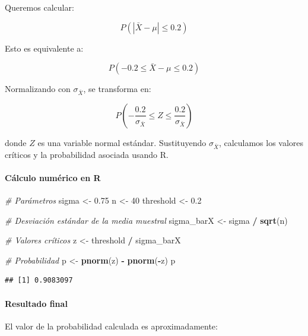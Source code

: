 \documentclass[
]{article}
\newenvironment{Shaded}{\begin{snugshade}}{\end{snugshade}}
\newcommand{\CommentTok}[1]{\textcolor[rgb]{0.56,0.35,0.01}{\textit{#1}}}
\newcommand{\DecValTok}[1]{\textcolor[rgb]{0.00,0.00,0.81}{#1}}
\newcommand{\FloatTok}[1]{\textcolor[rgb]{0.00,0.00,0.81}{#1}}
\newcommand{\FunctionTok}[1]{\textcolor[rgb]{0.13,0.29,0.53}{\textbf{#1}}}
\newcommand{\NormalTok}[1]{#1}
\newcommand{\OtherTok}[1]{\textcolor[rgb]{0.56,0.35,0.01}{#1}}
\newcommand{\SpecialCharTok}[1]{\textcolor[rgb]{0.81,0.36,0.00}{\textbf{#1}}}
\begin{document}
Queremos calcular:

\[
P(|\bar{X} - \mu| \leq 0.2)
\]

Esto es equivalente a:

\[
P\left(-0.2 \leq \bar{X} - \mu \leq 0.2\right)
\]

Normalizando con \(\sigma_{\bar{X}}\), se transforma en:

\[
P\left(-\frac{0.2}{\sigma_{\bar{X}}} \leq Z \leq \frac{0.2}{\sigma_{\bar{X}}}\right)
\]

donde \(Z\) es una variable normal estándar. Sustituyendo \(\sigma_{\bar{X}}\), calculamos los valores críticos y la probabilidad asociada usando R.

\paragraph{Cálculo numérico en R}\label{cuxe1lculo-numuxe9rico-en-r}

\begin{Shaded}
\begin{Highlighting}[]
\CommentTok{\# Parámetros}
\NormalTok{sigma }\OtherTok{\textless{}{-}} \FloatTok{0.75}
\NormalTok{n }\OtherTok{\textless{}{-}} \DecValTok{40}
\NormalTok{threshold }\OtherTok{\textless{}{-}} \FloatTok{0.2}

\CommentTok{\# Desviación estándar de la media muestral}
\NormalTok{sigma\_barX }\OtherTok{\textless{}{-}}\NormalTok{ sigma }\SpecialCharTok{/} \FunctionTok{sqrt}\NormalTok{(n)}

\CommentTok{\# Valores críticos}
\NormalTok{z }\OtherTok{\textless{}{-}}\NormalTok{ threshold }\SpecialCharTok{/}\NormalTok{ sigma\_barX}

\CommentTok{\# Probabilidad}
\NormalTok{p }\OtherTok{\textless{}{-}} \FunctionTok{pnorm}\NormalTok{(z) }\SpecialCharTok{{-}} \FunctionTok{pnorm}\NormalTok{(}\SpecialCharTok{{-}}\NormalTok{z)}
\NormalTok{p}
\end{Highlighting}
\end{Shaded}

\begin{verbatim}
## [1] 0.9083097
\end{verbatim}

\paragraph{Resultado final}\label{resultado-final-2}

El valor de la probabilidad calculada es aproximadamente:
\end{document}
